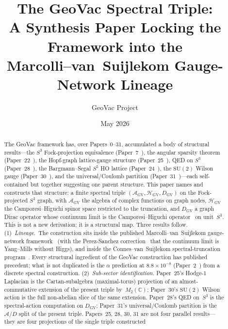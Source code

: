 \documentclass[11pt]{article}
\title{The GeoVac Spectral Triple:\\
A Synthesis Paper Locking the Framework into the\\
Marcolli--van~Suijlekom Gauge-Network Lineage}
\author{GeoVac Project}
\date{May 2026}
\begin{document}
\maketitle

\begin{abstract}
The GeoVac framework has, over Papers~0--31, accumulated a body of
structural results---the $S^3$ Fock-projection equivalence
(Paper~7~\cite{paper7}), the angular sparsity theorem
(Paper~22~\cite{paper22}), the Hopf-graph lattice-gauge structure
(Paper~25~\cite{paper25}), QED on $S^3$ (Paper~28~\cite{paper28}),
the Bargmann--Segal $S^5$ HO lattice (Paper~24~\cite{paper24}), the
$\mathrm{SU}(2)$ Wilson gauge (Paper~30~\cite{paper30}), and the
universal/Coulomb partition (Paper~31~\cite{paper31})---each
self-contained but together suggesting one parent structure.  This
paper names and constructs that structure: a finite spectral triple
$(\mathcal{A}_{\mathrm{GV}}, \mathcal{H}_{\mathrm{GV}},
D_{\mathrm{GV}})$ on the Fock-projected $S^3$ graph, with
$\mathcal{A}_{\mathrm{GV}}$ the algebra of complex functions on graph
nodes, $\mathcal{H}_{\mathrm{GV}}$ the Camporesi--Higuchi spinor space
restricted to the truncation, and $D_{\mathrm{GV}}$ a graph Dirac
operator whose continuum limit is the Camporesi--Higuchi
operator~\cite{camporesi_higuchi1996} on unit~$S^3$.  This is not a
new derivation; it is a structural map.  Three results follow.
(1)~\emph{Lineage.}~The construction sits inside the published
Marcolli--van~Suijlekom gauge-network framework~\cite{marcolli_vs2014}
(with the Perez-Sanchez correction~\cite{perez_sanchez2024,%
perez_sanchez2025} that the continuum limit is Yang--Mills without
Higgs), and inside the Connes--van~Suijlekom spectral-truncation
program~\cite{connes_vs2021,hekkelman2022,hekkelman_mcdonald2024}.  Every
structural ingredient of the GeoVac construction has published
precedent; what is not duplicated is the $\alpha$ prediction at
$8.8 \times 10^{-8}$ (Paper~2~\cite{paper2}) from a discrete spectral
construction.
(2)~\emph{Sub-sector identification.}  Paper~25's Hodge-1 Laplacian is
the Cartan-subalgebra (maximal-torus) projection of an
almost-commutative extension of the present triple by~$M_2(\mathbb{C})$;
Paper~30's $\mathrm{SU}(2)$ Wilson action is the full non-abelian
slice of the same extension.  Paper~28's QED on~$S^3$ is the
spectral-action computation on $D_{\mathrm{GV}}$; Paper~31's
universal/Coulomb partition is the $\mathcal{A}/D$ split of the
present triple.  Papers~25, 28, 30, 31 are not four parallel
results---they are four projections of the single triple constructed

\end{abstract}
\end{document}
